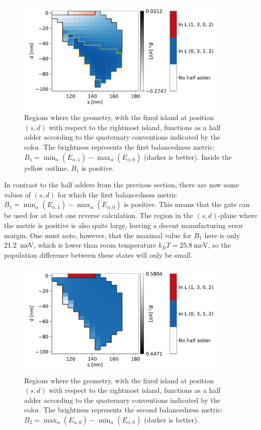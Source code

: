 \documentclass[11pt,a4paper,english,twoside]{article}
\begin{document}
\begin{figure}
    \centering
    \includegraphics[width=0.9\textwidth]{Figures/half_adder/sweep/000006_d-s/tableside(d0-100_5,s100-180_5)_balanced1.pdf}
    \caption{Regions where the geometry, with the fixed island at position $(s, d)$ with respect to the rightmost island, functions as a half adder according to the quaternary conventions indicated by the color. The brightness represents the first balancedness metric: $B_1 = \min_\alpha(E_{\alpha,1}) - \max_\alpha(E_{\alpha,0})$ (darker is better). Inside the yellow outline, $B_1$ is positive.} 
    \label{fig:HalfAdder_000006_sweepnew_d-s_balanced1}
\end{figure}
In contrast to the half adders from the previous section, there are now some values of $(s,d)$ for which the first balancedness metric $B_1 = \min_\alpha(E_{\alpha,1}) - \max_\alpha(E_{\alpha,0})$ is positive. This means that the gate can be used for at least one reverse calculation. The region in the $(s,d)$-plane where the metric is positive is also quite large, leaving a decent manufacturing error margin. One must note, however, that the maximal value for $B_1$ here is only \SI{21.2}{\milli\electronvolt}, which is lower than room temperature $k_B T = \SI{25.8}{\milli\electronvolt}$, so the population difference between these states will only be small. \par
\begin{figure}
    \centering
    \includegraphics[width=0.9\textwidth]{Figures/half_adder/sweep/000006_d-s/tableside(d0-100_5,s100-180_5)_balanced2.pdf}
    \caption{Regions where the geometry, with the fixed island at position $(s, d)$ with respect to the rightmost island, functions as a half adder according to the quaternary conventions indicated by the color. The brightness represents the second balancedness metric: $B_2 = \max_\alpha(E_{\alpha,0}) - \min_\alpha(E_{\alpha,0})$ (darker is better).} 
    \label{fig:HalfAdder_000006_sweepnew_d-s_balanced2}
\end{figure}
\end{document}
